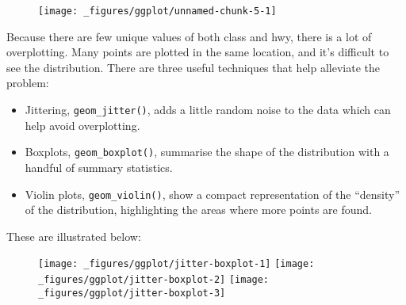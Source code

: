 \begin{Shaded}
\begin{Highlighting}[]
\OperatorTok{+}\StringTok{ }
\StringTok{  }\NormalTok{()}
\end{Highlighting}
\end{Shaded}

\begin{figure}[H]
  \centering
  \texttt{[image: \_figures/ggplot/unnamed-chunk-5-1]}
\end{figure}

Because there are few unique values of both class and hwy, there is a
lot of overplotting. Many points are plotted in the same location, and
it's difficult to see the distribution. There are three useful
techniques that help alleviate the problem:

\begin{itemize}
\item
  Jittering, \texttt{geom\_jitter()}, adds a little random noise to the
  data which can help avoid overplotting. 
\item
  Boxplots, \texttt{geom\_boxplot()}, summarise the shape of the
  distribution with a handful of summary statistics. 
\item
  Violin plots, \texttt{geom\_violin()}, show a compact representation
  of the ``density'' of the distribution, highlighting the areas where
  more points are found.  
\end{itemize}

These are illustrated below:

\begin{Shaded}
\begin{Highlighting}[]
\OperatorTok{+}\StringTok{ }\NormalTok{()}
\OperatorTok{+}\StringTok{ }\NormalTok{()}
\OperatorTok{+}\StringTok{ }\NormalTok{()}
\end{Highlighting}
\end{Shaded}

\begin{figure}[H]
  \texttt{[image: \_figures/ggplot/jitter-boxplot-1]}%
  \texttt{[image: \_figures/ggplot/jitter-boxplot-2]}%
  \texttt{[image: \_figures/ggplot/jitter-boxplot-3]}
\end{figure}

